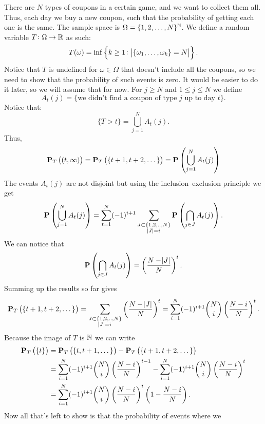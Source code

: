 \documentclass[11pt,a4paper]{article}
\begin{document}
  \begin{example}
    There are $N$ types of coupons in a certain game, and we want to collect
    them all. 
    Thus, each day we buy a new coupon, such that the probability of getting
    each one is the same.
    The sample space is $\Omega = \{1,2,\dots,N\}^{\mathbb{N}}$.
    We define a random variable $T \colon \Omega \to \mathbb{R}$ as such:
    \[
      T(\omega) = 
      \inf\set[2]{k \geq 1 \colon \abs{\set{\omega_1,\dots,\omega_k} = N}}.
    \]
    Notice that $T$ is undefined for $\omega \in \Omega$ that doesn't include
    all the coupons, so we need to show that the probability of such events
    is zero. It would be easier to do it later, so we will assume that for
    now. For $j \geq N$ and $1 \le j \le N$ we define
    \[
      A_t(j) = \{\text{we didn't find a coupon of type $j$ up to day $t$}\}.
    \]
    Notice that:
    \[
      \{T > t\} = \bigcup_{j=1}^{N} A_t(j).
    \]
    Thus,
    \[
      \mathbf{P}_T\left((t,\infty)\right) =
      \mathbf{P}_T\left(\{t + 1, t + 2, \dots\}\right) =
      \mathbf{P}\left(\bigcup_{j=1}^{N} A_t(j) \right)
    \]
    The events $A_t(j)$ are not disjoint but using the inclusion--exclusion
    principle we get
    \[
      \mathbf{P}\left(\bigcup_{j=1}^{N} A_t(j) \right) =
      \sum_{t=1}^{N}(-1)^{i+1} 
      \sum_{\substack{J\subset\{1,2,..,N\} \\ \abs{J} = i}}
      \mathbf{P}\left(\bigcap_{j\in J}A_{t}(j)\right).
    \]
    We can notice that
    \[
      \mathbf{P}\left(\bigcap_{j\in J}A_{t}(j)\right) = 
      \left(\frac{N - \abs{J}}{N}\right)^t.
    \]
    Summing up the results so far gives
    \[
      \mathbf{P}_T\left(\{t + 1, t + 2, \dots\}\right) =
      \sum_{\substack{J\subset\{1,2,..,N\} \\ \abs{J} = i}}
      \left(\frac{N - \abs{J}}{N}\right)^t =
      \sum_{i=1}^{N} (-1)^{i+1} \binom{N}{i} \left(\frac{N-i}{N}\right)^{t}.
    \]
    Because the image of $T$ is $\mathbb{N}$ we can write
    \begin{align*}
      \mathbf{P}_T\left(\{t\}\right) &=
      \mathbf{P}_T\left(\{t, t + 1, \dots\}\right) -
      \mathbf{P}_T\left(\{t + 1, t + 2, \dots\}\right) \\ &=
      \sum_{i=1}^{N}(-1)^{i+1}\binom{N}{i}\left(\frac{N-i}{N}\right)^{t-1} -
      \sum_{i=1}^{N}(-1)^{i+1}\binom{N}{i}\left(\frac{N-i}{N}\right)^{t} \\ &=
      \sum_{i=1}^{N}(-1)^{i+1}\binom{N}{i}\left(\frac{N-i}{N}\right)^{t}
      \left(1 - \frac{N-i}{N}\right).
    \end{align*}
    Now all that's left to show is that the probability of events where we

\end{example}
\end{document}
